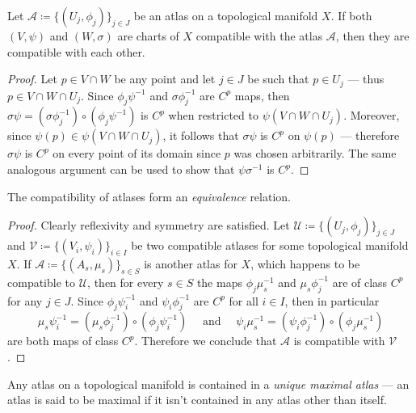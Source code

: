 \begin{lemma}
\label{lem:compatible-charts-with-atlas-are-compatible}
Let \(\mathcal{A} \coloneq \{(U_j, \phi_j)\}_{j \in J}\) be an atlas on a
topological manifold \(X\). If both \((V, \psi)\) and \((W, \sigma)\) are charts
of \(X\) compatible with the atlas \(\mathcal{A}\), then they are compatible
with each other.
\end{lemma}

\begin{proof}
Let \(p \in V \cap W\) be any point and let \(j \in J\) be such that
\(p \in U_j\) --- thus \(p \in V \cap W \cap U_j\). Since \(\phi_j \psi^{-1}\)
and \(\sigma \phi_j^{-1}\) are \(C^p\) maps, then
\(\sigma \psi = (\sigma \phi_j^{-1}) \circ (\phi_j \psi^{-1})\) is \(C^p\) when
restricted to \(\psi(V \cap W \cap U_j)\). Moreover, since
\(\psi(p) \in \psi(V \cap W \cap U_j)\), it follows that \(\sigma \psi\) is
\(C^p\) on \(\psi(p)\) --- therefore \(\sigma \psi\) is \(C^p\) on every point
of its domain since \(p\) was chosen arbitrarily. The same analogous argument
can be used to show that \(\psi \sigma^{-1}\) is \(C^p\).
\end{proof}

\begin{proposition}
\label{prop:compatible-atlas-equivalence-relation}
The compatibility of atlases form an \emph{equivalence} relation.
\end{proposition}

\begin{proof}
Clearly reflexivity and symmetry are satisfied. Let
\(\mathcal{U} \coloneq \{(U_{j}, \phi_j)\}_{j \in J}\) and
\(\mathcal{V} \coloneq \{(V_{i}, \psi_i)\}_{i \in I}\) be two compatible atlases
for some topological manifold \(X\). If
\(\mathcal{A} \coloneq \{(A_{s}, \mu_s)\}_{s \in S}\) is another atlas for
\(X\), which happens to be compatible to \(\mathcal{U}\), then for every
\(s \in S\) the maps \(\phi_j \mu_{s}^{-1}\) and \(\mu_s \phi_j^{-1}\)
are of class \(C^p\) for any \(j \in J\). Since \(\phi_j \psi_i^{-1}\) and
\(\psi_i \phi_j^{-1}\) are \(C^p\) for all \(i \in I\), then in particular
\[
\mu_s \psi_i^{-1} = (\mu_s \phi_j^{-1}) \circ (\phi_j \psi_i^{-1})
\quad\text{ and }\quad
\psi_i \mu_s^{-1} = (\psi_i \phi_j^{-1}) \circ (\phi_j \mu_s^{-1})
\]
are both maps of class \(C^p\). Therefore we conclude that \(\mathcal{A}\) is
compatible with \(\mathcal{V}\).
\end{proof}

\begin{corollary}
\label{cor:unique-maximal-atlas}
Any atlas on a topological manifold is contained in a \emph{unique maximal
  atlas} --- an atlas is said to be maximal if it isn't contained in any atlas
other than itself.
\end{corollary}


